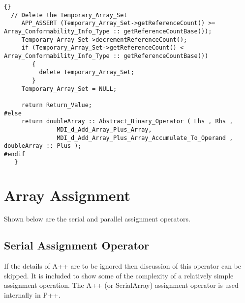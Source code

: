 \documentclass[10pt]{llncs}
\begin{document}
\begin{lstlisting}{}
  // Delete the Temporary_Array_Set
     APP_ASSERT (Temporary_Array_Set->getReferenceCount() >= Array_Conformability_Info_Type :: getReferenceCountBase());
     Temporary_Array_Set->decrementReferenceCount();
     if (Temporary_Array_Set->getReferenceCount() < Array_Conformability_Info_Type :: getReferenceCountBase())
        {
          delete Temporary_Array_Set;
        }
     Temporary_Array_Set = NULL;

     return Return_Value;
#else
     return doubleArray :: Abstract_Binary_Operator ( Lhs , Rhs , 
               MDI_d_Add_Array_Plus_Array,
               MDI_d_Add_Array_Plus_Array_Accumulate_To_Operand , doubleArray :: Plus );
#endif
   }

\end{lstlisting}


\newpage
\section{Array Assignment}
    Shown below are the serial and parallel assignment operators.

\subsection{Serial Assignment Operator}
   
    If the details of A++ are to be ignored then discussion of this operator can be skipped.
It is included to show some of the complexity of a relatively simple assignment operation.
The A++ (or SerialArray) assignment operator is used internally in P++.

\vspace{0.5in}
\end{document}
